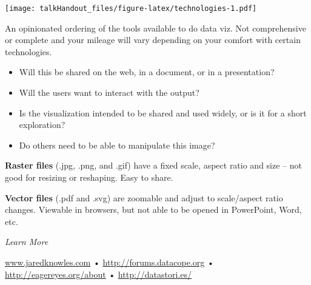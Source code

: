 \documentclass{tufte-handout}
\begin{document}
\begin{marginfigure}
 \texttt{[image: talkHandout\_files/figure-latex/technologies-1.pdf]}
\caption{An opinionated ordering of the tools available to do data viz. Not comprehensive or complete and your mileage will vary depending on your comfort with certain technologies.}
\end{marginfigure}

\begin{itemize}
\itemsep1pt\parskip0pt
\item
  Will this be shared on the web, in a document, or in a presentation?
\item
  Will the users want to interact with the output?
\item
  Is the visualization intended to be shared and used widely, or is it
  for a short exploration?
\item
  Do others need to be able to manipulate this image?
\end{itemize}

\noindent \textbf{Raster files} (.jpg, .png, and .gif) have a fixed scale, 
aspect ratio and size -- not good for resizing or reshaping. Easy to share.

\vspace{2.5mm}

\noindent \textbf{Vector files} (.pdf and .svg) are zoomable and adjust to
scale/aspect ratio changes. Viewable in browsers, but not able to be
opened in PowerPoint, Word, etc.

\vspace{2.5mm}
\noindent \emph{Learn More}

\noindent \href{http://www.jaredknowles.com/presentations}{\url{www.jaredknowles.com}} •
\href{http://forums.datacope.org}{\url{http://forums.datacope.org}} •
\href{http://eagereyes.org/about}{\url{http://eagereyes.org/about}} •
\href{http://datastori.es/}{\url{http://datastori.es/}}
\end{document}
